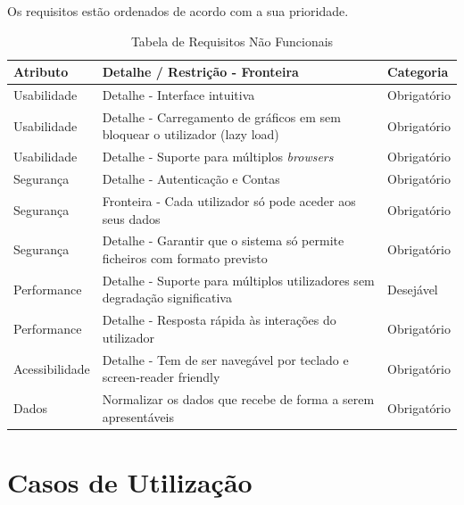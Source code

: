 Os requisitos estão ordenados de acordo com a sua prioridade.
\begin{table}[h!]
    \centering
    \begin{tabular}{|l|p{7cm}|l|}
    \hline
    \textbf{Atributo} & \textbf{Detalhe / Restrição - Fronteira} & \textbf{Categoria} \\
    \hline
    Usabilidade & Detalhe - Interface intuitiva & Obrigatório \\
    Usabilidade & Detalhe - Carregamento de gráficos em sem bloquear o utilizador (lazy load) & Obrigatório \\
    Usabilidade & Detalhe - Suporte para múltiplos \textit{browsers} & Obrigatório \\
    Segurança & Detalhe - Autenticação e Contas & Obrigatório \\
    Segurança & Fronteira - Cada utilizador só pode aceder aos seus dados & Obrigatório \\
    Segurança & Detalhe - Garantir que o sistema só permite ficheiros com formato previsto & Obrigatório \\
    Performance & Detalhe - Suporte para múltiplos utilizadores sem degradação significativa & Desejável \\
    Performance & Detalhe - Resposta rápida às interações do utilizador & Obrigatório \\
    Acessibilidade & Detalhe - Tem de ser navegável por teclado e screen-reader friendly & Obrigatório \\
    Dados & Normalizar os dados que recebe de forma a serem apresentáveis & Obrigatório \\

    \hline
    \end{tabular}
    \caption{Tabela de Requisitos Não Funcionais}
    \label{tab:requisitosNaofuncionais}
    \end{table}
    

\chapter{Casos de Utilização}
\label{ch:casosUtilizacao}

